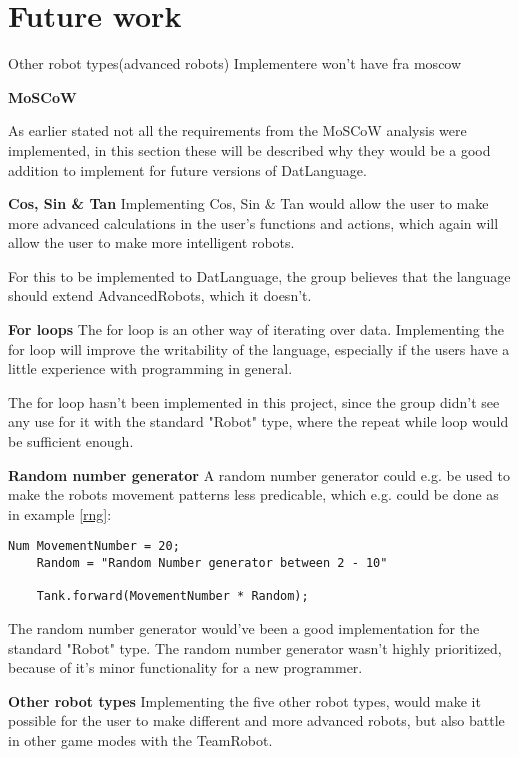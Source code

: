 \chapter{Future work}
Other robot types(advanced robots)
Implementere won't have fra moscow

\textbf{\LARGE{MoSCoW}}

As earlier stated not all the requirements from the MoSCoW analysis were implemented, in this section these will be described why they would be a good addition to implement for future versions of DatLanguage.

\textbf{Cos, Sin \& Tan}\newline
Implementing Cos, Sin \& Tan would allow the user to make more advanced calculations in the user's functions and actions, which again will allow the user to make more intelligent robots. 

For this to be implemented to DatLanguage, the group believes that the language should extend AdvancedRobots, which it doesn't. 

\textbf{For loops} \newline
The for loop is an other way of iterating over data. Implementing the for loop will improve the writability of the language, especially if the users have a little experience with programming in general.

The for loop hasn't been implemented in this project, since the group didn't see any use for it with the standard "Robot" type, where the repeat while loop would be sufficient enough. 

\textbf{Random number generator}\newline
A random number generator could e.g. be used to make  the robots movement patterns less predicable, which e.g. could be done as in example \ref{rng}: 

\begin{lstlisting}[caption={Simple example of a random number generator}, label={rng}]
	Num MovementNumber = 20;
	Random = "Random Number generator between 2 - 10"
	
	Tank.forward(MovementNumber * Random);
\end{lstlisting}

The random number generator would've been a good implementation for the standard "Robot" type. The random number generator wasn't highly prioritized, because of it's minor functionality for a new programmer.

\textbf{Other robot types}\newline
Implementing the five other robot types, would make it possible for the user to make different and more advanced robots, but also battle in other game modes with the TeamRobot.

